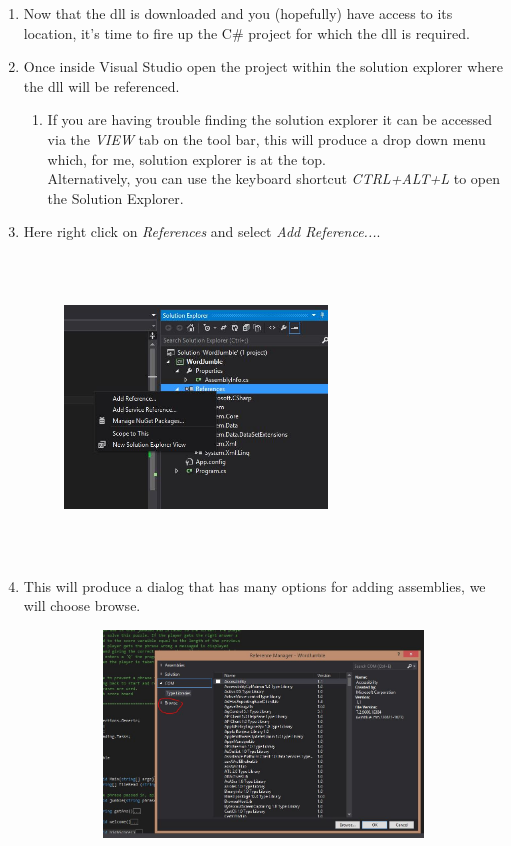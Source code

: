 \documentclass {article}
\begin{document}
\begin{enumerate}
	\item Now that the dll is downloaded and you (hopefully) have access to its location, it's time to fire up the C\# project for which the dll is required. 
	\item Once inside Visual Studio open the project within the solution explorer where the dll will be referenced.
	\begin {enumerate}
		\item If you are having trouble finding the solution explorer it can be accessed via the \textit{VIEW} tab on the tool bar, this will produce a drop down menu which, for me, 				solution explorer is at the top. \\ \vspace{2mm} Alternatively, you can use the keyboard shortcut \textit{CTRL+ALT+L} to open the Solution Explorer.
	\end {enumerate}
	\item Here right click on \textit{References} and select \textit{Add Reference...}.
	\begin{figure}[H]
		\centerline{\includegraphics[width=70mm, height=80mm]{AddReference.JPG}}
	\end {figure}
	\item This will produce a dialog that has many options for adding assemblies, we will choose browse.
	\begin{figure}[H]
		\centerline{\includegraphics[width=130mm, height=55mm]{ReferenceDialog.JPG}}

\end{figure}
\end{enumerate}
\end{document}
